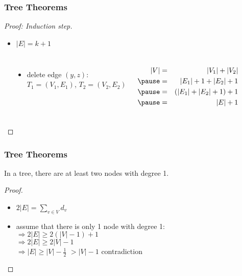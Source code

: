 \documentclass[dvipsnames]{beamer}
\begin{document}
\begin{frame}
  \frametitle{Tree Theorems}

  \begin{proof}[Proof: Induction step]
    \begin{itemize}
      \item $|E|=k+1$
    \end{itemize}

    \begin{columns}[t]
      \begin{center}
      \end{center}

      \pause
      \begin{itemize}
        \item delete edge $(y,z)$:\\
          $T_1=(V_1,E_1)$, $T_2=(V_2,E_2)$
      \end{itemize}
      \pause
      \begin{eqnarray*}
        |V| & = & |V_1|+|V_2|\\\pause
            & = & |E_1|+1+|E_2|+1\\\pause
            & = & (|E_1|+|E_2|+1)+1\\\pause
            & = & |E|+1
      \end{eqnarray*}
    \end{columns}
  \end{proof}
\end{frame}

\begin{frame}
  \frametitle{Tree Theorems}

  \begin{theorem}
    In a tree, there are at least two nodes with degree 1.
  \end{theorem}

  \pause
  \begin{proof}
    \begin{itemize}
      \item $2 |E| = \sum_{v \in V} d_v$

      \pause
      \item assume that there is only 1 node with degree 1:\\
        \pause
        $\Rightarrow 2 |E| \geq 2 (|V| - 1) + 1$\\
        \pause
        $\Rightarrow 2 |E| \geq 2 |V| - 1$\\
        \pause
        $\Rightarrow |E| \geq |V| - \frac{1}{2}$
        \pause
        $> |V| - 1$ \alert{contradiction}
    \end{itemize}
  \end{proof}
\end{frame}
\end{document}
